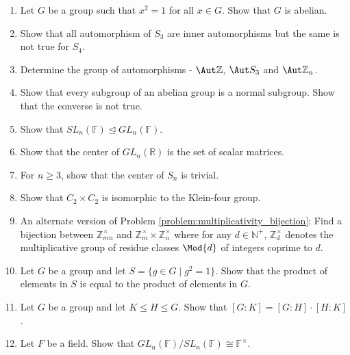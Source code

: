 \begin{enumerate}[resume]
    \item Let $G$ be a group such that $x^2 = 1$ for all $x \in G$. Show that $G$ is abelian.
    \item Show that all automorphism of $S_3$ are inner automorphisms but the same is not true for $S_4$.
    \item \label{problem:Aut} Determine the group of automorphisms - $\Aut\mathbb{Z}$, $\Aut S_3$ and $\Aut\mathbb{Z}_n$.
    \item Show that every subgroup of an abelian group is a normal subgroup. Show that the converse is not true.
    \item Show that $SL_n(\mathbb{F}) \trianglelefteq GL_n(\mathbb{F})$.
    \item Show that the center of $GL_n(\mathbb{R})$ is the set of scalar matrices.
    \item For $n \geq 3$, show that the center of $S_n$ is trivial.
    \item Show that $C_2 \times C_2$ is isomorphic to the Klein-four group.
    \item An alternate version of Problem \ref{problem:multiplicativity_bijection}: Find a bijection between $\mathbb{Z}_{mn}^{\times}$ and $\mathbb{Z}_m^{\times} \times \mathbb{Z}_n^{\times}$ where for any $d \in \mathbb{N}^+$, $\mathbb{Z}_d^{\times}$ denotes the multiplicative group of residue classes $\Mod{d}$ of integers coprime to $d$.
    \item Let $G$ be a group and let $S = \{ g \in G \mid g^2 = 1 \}$. Show that the product of elements in $S$ is equal to the product of elements in $G$.
    \item Let $G$ be a group and let $K \leq H \leq G$. Show that $[G:K] = [G:H] \cdot [H:K]$.
    \item Let $F$ be a field. Show that $GL_n(\mathbb{F})/SL_n(\mathbb{F}) \cong \mathbb{F}^{\times}$.
\end{enumerate}